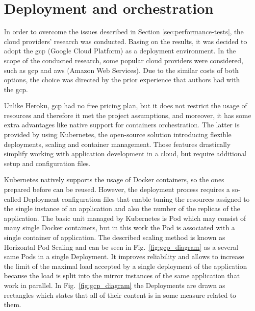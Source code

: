 \section{Deployment and orchestration}\label{sec:deployment-and-orchestration}
In order to overcome the issues described in Section \ref{sec:performance-tests}, the cloud providers' research was conducted.
Basing on the results, it was decided to adopt the \gls{gcp} (Google Cloud Platform) as a deployment environment.
In the scope of the conducted research, some popular cloud providers were considered, such as \gls{gcp} and \gls{aws} (Amazon Web Services).
Due to the similar costs of both options, the choice was directed by the prior experience that authors had with the \gls{gcp}.

Unlike Heroku, \gls{gcp} had no free pricing plan, but it does not restrict the usage of resources and therefore it met the project assumptions, and moreover, it has some extra advantages like native support for containers orchestration.
The latter is provided by using Kubernetes, the open-source solution introducing flexible deployments, scaling and container management.
Those features drastically simplify working with application development in a cloud, but require additional setup and configuration files.

Kubernetes natively supports the usage of Docker containers, so the ones prepared before can be reused.
However, the deployment process requires a so-called Deployment configuration files that enable tuning the resources assigned to the single instance of an application and also the number of the replicas of the application.
The basic unit managed by Kubernetes is Pod which may consist of many single Docker containers, but in this work the Pod is associated with a single container of application.
The described scaling method is known as Horizontal Pod Scaling and can be seen in Fig.~\ref{fig:gcp_diagram} as a several same Pods in a single Deployment.
It improves reliability and allows to increase the limit of the maximal load accepted by a single deployment of the application because the load is split into the mirror instances of the same application that work in parallel.
In Fig.~\ref{fig:gcp_diagram} the Deployments are drawn as rectangles which states that all of their content is in some measure related to them.


